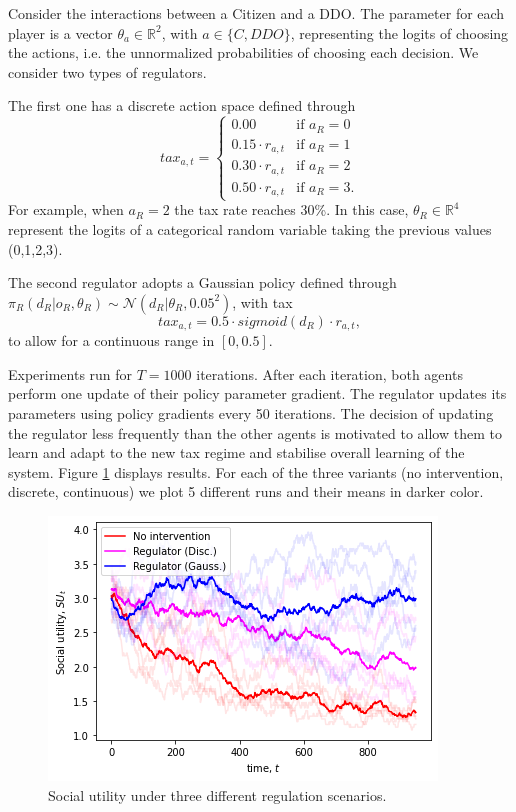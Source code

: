 Consider the interactions between a Citizen and a DDO. 
The parameter for 
each player is a vector $\theta_a \in \mathbb{R}^2$, with $a \in \lbrace C, DDO\rbrace $, representing the logits of choosing the actions,
i.e. the unnormalized probabilities of choosing each decision.
We consider two types of regulators.

The first one has a discrete action space defined through
$$
        tax_{a,t} =  \begin{cases} 0.00 & \text{if } a_R = 0\\
        0.15\cdot r_{a,t} & \text{if } a_R = 1\\
        0.30\cdot r_{a,t} & \text{if } a_R = 2\\
        0.50 \cdot r_{a,t} & \text{if } a_R = 3. \end{cases}
$$
For example, when $a_R=2$ the tax rate reaches 30\%.
In this case, $\theta_R \in \mathbb{R}^4$ represent the 
logits of a categorical 
random variable taking the previous values (0,1,2,3).

The second regulator adopts a Gaussian policy defined 
through $\pi_R(d_R | o_R, \theta_R) \sim \mathcal{N}(d_R | \theta_R, 0.05^2)$, with tax 
$$
tax_{a,t} = 0.5 \cdot sigmoid(d_R) \cdot r_{a,t},
$$
to allow 
for a continuous range in $\left[ 0, 0.5 \right]$.

Experiments run for $T=1000$ iterations.
After each iteration, both agents perform one update of
their policy parameter gradient.
The regulator updates its parameters using policy gradients every 50 iterations.
The decision of updating the regulator less frequently than the other agents is motivated to allow them to learn and adapt to the new tax regime and stabilise
 overall learning of the system.
Figure \ref{fig:su} displays results. 
 For each of the three variants (no intervention, discrete, continuous) we plot 5 different runs and their means in darker color.
 
\begin{figure}[!h]
\centering
\includegraphics[width=0.55\linewidth]{img/su.png}
\caption{Social utility under three different regulation scenarios.}\label{fig:su}
\end{figure}

